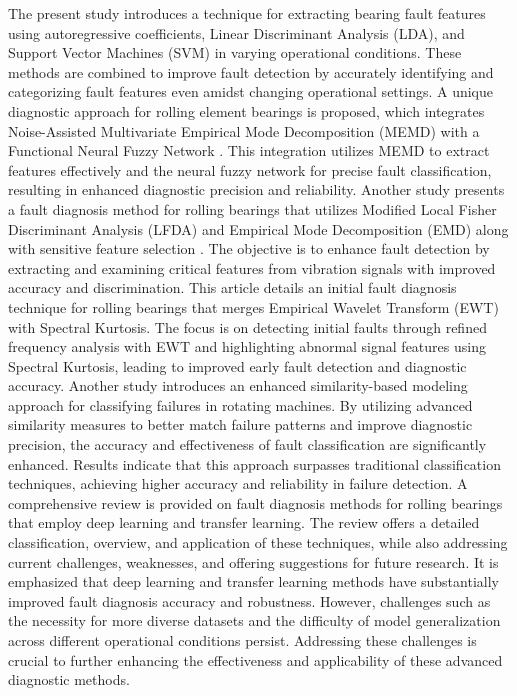 \documentclass[sn-basic,pdflatex]{sn-jnl}
\theoremstyle{remark}
\theoremstyle{definition}
\begin{document}
The present study \citep{WOS:000440977000032} introduces a technique for
extracting bearing fault features using autoregressive coefficients,
Linear Discriminant Analysis (LDA), and Support Vector Machines (SVM) in
varying operational conditions. These methods are combined to improve
fault detection by accurately identifying and categorizing fault
features even amidst changing operational settings. A unique diagnostic
approach for rolling element bearings is proposed, which integrates
Noise-Assisted Multivariate Empirical Mode Decomposition (MEMD) with a
Functional Neural Fuzzy Network \citep{WOS:000434717400001}. This
integration utilizes MEMD to extract features effectively and the neural
fuzzy network for precise fault classification, resulting in enhanced
diagnostic precision and reliability. Another study
\citep{WOS:000426284100001} presents a fault diagnosis method for
rolling bearings that utilizes Modified Local Fisher Discriminant
Analysis (LFDA) and Empirical Mode Decomposition (EMD) along with
sensitive feature selection . The objective is to enhance fault
detection by extracting and examining critical features from vibration
signals with improved accuracy and discrimination.
\citep{WOS:000539546400083} This article details an initial fault
diagnosis technique for rolling bearings that merges Empirical Wavelet
Transform (EWT) with Spectral Kurtosis. The focus is on detecting
initial faults through refined frequency analysis with EWT and
highlighting abnormal signal features using Spectral Kurtosis, leading
to improved early fault detection and diagnostic accuracy. Another study
\citep{HAKIM:2023101945} introduces an enhanced similarity-based
modeling approach for classifying failures in rotating machines. By
utilizing advanced similarity measures to better match failure patterns
and improve diagnostic precision, the accuracy and effectiveness of
fault classification are significantly enhanced. Results indicate that
this approach surpasses traditional classification techniques, achieving
higher accuracy and reliability in failure detection. A comprehensive
review is provided on fault diagnosis methods for rolling bearings that
employ deep learning and transfer learning. The review offers a detailed
classification, overview, and application of these techniques, while
also addressing current challenges, weaknesses, and offering suggestions
for future research. It is emphasized that deep learning and transfer
learning methods have substantially improved fault diagnosis accuracy
and robustness. However, challenges such as the necessity for more
diverse datasets and the difficulty of model generalization across
different operational conditions persist. Addressing these challenges is
crucial to further enhancing the effectiveness and applicability of
these advanced diagnostic methods.
\end{document}
